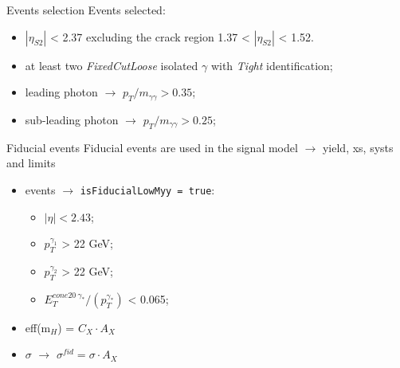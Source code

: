 \documentclass[10pt,UKenglish, leqno, xcolor = dvipsnames]{beamer}
\begin{document}
	
	\begin{frame}{Events selection}
		\vfill
		Events selected:
		\begin{itemize}
			\item $|\eta_{S2}|$ < 2.37 excluding the crack region 1.37 < $|\eta_{S2}|$ < 1.52.
			\item at least two \textit{FixedCutLoose} isolated $\gamma$ with \textit{Tight} identification;
			\item leading photon $\rightarrow$ $p_T/m_{\gamma\gamma} > 0.35$;
			\item sub-leading photon $\rightarrow$ $p_T/m_{\gamma\gamma} > 0.25$;
		\end{itemize}
		
		\vspace{0.5cm}
		\vfill
	\end{frame}

	\begin{frame}{Fiducial events}
		\vfill
		Fiducial events are used in the signal model $\to$ yield, xs, systs and limits
		\begin{itemize}
			\item events $\to$ \texttt{isFiducialLowMyy = true}:
			\begin{itemize}
				\item $|\eta|<2.43$;
				\item $p_T^{\gamma_1}$ > 22 GeV;
				\item $p_T^{\gamma_2}$ > 22 GeV;
				\item $E_{T}^{cone20\ \gamma_*}/(p_T^{\gamma_*})$ < 0.065;
			\end{itemize} 
			\item eff(m$_H$) = $C_X\cdot A_X$
			\item $\sigma$ $\to$ $\sigma^{fid} = \sigma\cdot A_X$
		\end{itemize}
		\vfill
	\end{frame}
	
\end{document}
